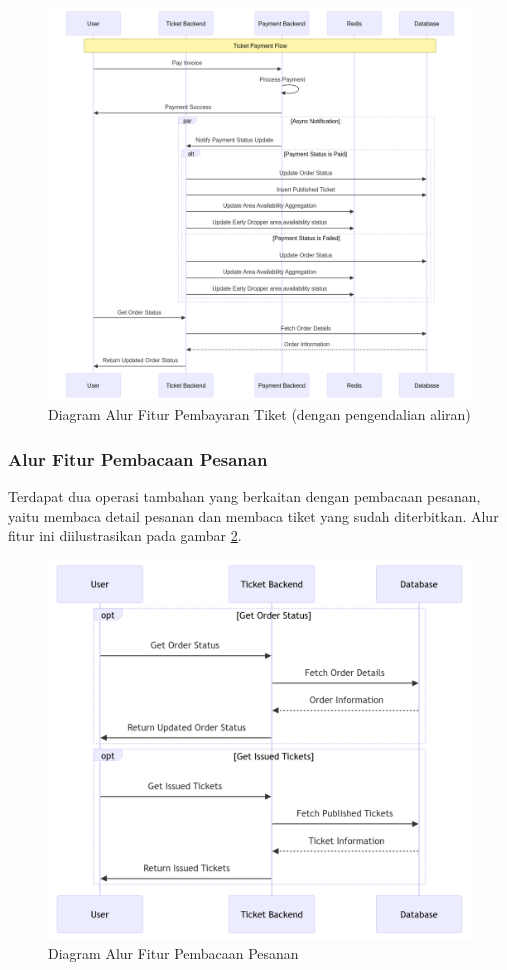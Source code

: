 \begin{figure}[h]
    \centering
    \includegraphics[width=1\textwidth]{resources/chapter-3/order-payment-fc.png}
    \caption{Diagram Alur Fitur Pembayaran Tiket (dengan pengendalian aliran)}
    \label{fig:flow-order-payment-fc}
\end{figure}

\pagebreak

\subsubsection{Alur Fitur Pembacaan Pesanan}

Terdapat dua operasi tambahan yang berkaitan dengan pembacaan pesanan, yaitu membaca detail pesanan dan membaca tiket yang sudah diterbitkan. Alur fitur ini diilustrasikan pada gambar \ref{fig:flow-order-flow}.

\begin{figure}[h]
    \centering
    \includegraphics[width=1\textwidth]{resources/chapter-3/order-flow.png}
    \caption{Diagram Alur Fitur Pembacaan Pesanan}
    \label{fig:flow-order-flow}
\end{figure}